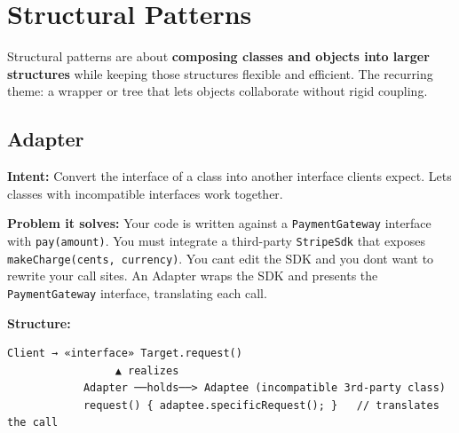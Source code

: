 \documentclass[11pt]{article}
\begin{document}
\section{Structural Patterns}\label{structural-patterns}

Structural patterns are about \textbf{composing classes and objects into larger structures} while keeping those structures flexible and efficient. The recurring theme: a wrapper or tree that lets objects collaborate without rigid coupling.

\subsection{Adapter}\label{adapter}

\textbf{Intent:} Convert the interface of a class into another interface clients expect. Lets classes with incompatible interfaces work together.

\textbf{Problem it solves:} Your code is written against a \texttt{PaymentGateway} interface with \texttt{pay(amount)}. You must integrate a third-party \texttt{StripeSdk} that exposes \texttt{makeCharge(cents,\ currency)}. You can\textquotesingle t edit the SDK and you don\textquotesingle t want to rewrite your call sites. An Adapter wraps the SDK and presents the \texttt{PaymentGateway} interface, translating each call.

\textbf{Structure:}

\setcodelang{}

\begin{verbatim}
Client → «interface» Target.request()
                 ▲ realizes
            Adapter ──holds──> Adaptee (incompatible 3rd-party class)
            request() { adaptee.specificRequest(); }   // translates the call
\end{verbatim}

\end{document}
